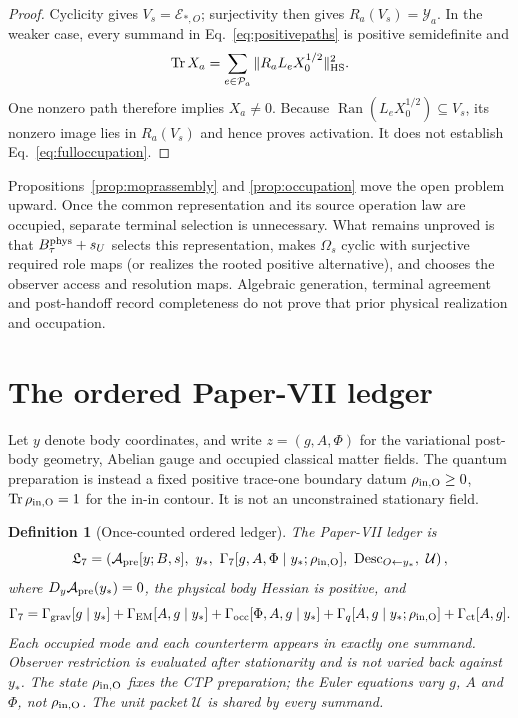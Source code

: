 \documentclass[11pt]{article}
\newtheorem{definition}{Definition}
\begin{document}
\begin{proof}
Cyclicity gives $V_s=\mathcal E_{*,O}$; surjectivity then gives
$R_a(V_s)=\mathcal Y_a$.  In the weaker case, every summand in
Eq.~\eqref{eq:positivepaths} is positive semidefinite and
\begin{equation}
\operatorname{Tr}X_a
=\sum_{e\in\mathcal P_a}\|R_aL_eX_0^{1/2}\|_{\rm HS}^2.
\end{equation}
One nonzero path therefore implies $X_a\neq0$.  Because
$\operatorname{Ran}(L_eX_0^{1/2})\subseteq V_s$, its nonzero image lies in
$R_a(V_s)$ and hence proves activation.  It does not establish
Eq.~\eqref{eq:fulloccupation}.
\end{proof}

Propositions~\ref{prop:moprassembly} and \ref{prop:occupation} move the open
problem upward.  Once the common representation and its source operation law
are occupied, separate terminal selection is unnecessary.  What remains
unproved is that $B_\tau^{\rm phys}+s_U$ selects this representation, makes
$\Omega_s$ cyclic with surjective required role maps (or realizes the rooted
positive alternative), and chooses
the observer access and resolution maps.  Algebraic generation, terminal
agreement and post-handoff record completeness do not prove that prior
physical realization and occupation.

\section{The ordered Paper-VII ledger}

Let $y$ denote body coordinates, and write $z=(g,A,\Phi)$ for the variational
post-body geometry, Abelian gauge and occupied classical matter fields.  The
quantum preparation is instead a fixed positive trace-one boundary datum
$\rho_{\rm in,O}\geq0$, $\operatorname{Tr}\rho_{\rm in,O}=1$ for the in-in
contour.  It is not an unconstrained stationary field.

\begin{definition}[Once-counted ordered ledger]
The Paper-VII ledger is
\begin{equation}
\mathfrak L_7=\left(
\mathcal A_{\rm pre}[y;B,s],\ y_*,\
\Gamma_7[g,A,\Phi\mid y_*;\rho_{\rm in,O}],\
\operatorname{Desc}_{O\leftarrow y_*},\ \mathcal U
\right),
\end{equation}
where $D_y\mathcal A_{\rm pre}(y_*)=0$, the physical body Hessian is positive,
and
\begin{equation}
\Gamma_7=\Gamma_{\rm grav}[g\mid y_*]
+\Gamma_{\rm EM}[A,g\mid y_*]
+\Gamma_{\rm occ}[\Phi,A,g\mid y_*]
+\Gamma_q[A,g\mid y_*;\rho_{\rm in,O}]+\Gamma_{\rm ct}[A,g].
\label{eq:jointfunctional}
\end{equation}
Each occupied mode and each counterterm appears in exactly one summand.
Observer restriction is evaluated after stationarity and is not varied back
against $y_*$.  The state $\rho_{\rm in,O}$ fixes the CTP preparation; the
Euler equations vary $g$, $A$ and $\Phi$, not $\rho_{\rm in,O}$.  The unit
packet $\mathcal U$ is shared by every summand.
\end{definition}
\end{document}
